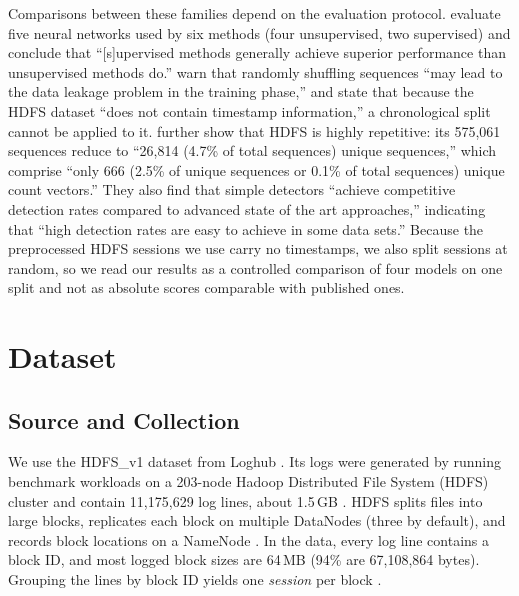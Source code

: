 \documentclass[11pt]{article}
\begin{document}
Comparisons between these families depend on the evaluation protocol.
\citet{chen2022experiencereportdeeplearningbased} evaluate five neural networks used by six methods (four unsupervised,
two supervised) and conclude that ``[s]upervised methods generally achieve superior
performance than unsupervised methods do.'' \citet{LeZhang2022} warn that
randomly shuffling sequences ``may lead to the data leakage problem in the training
phase,'' and state that because the HDFS dataset ``does not contain timestamp
information,'' a chronological split cannot be applied to it.
\citet{Landauer2024} further show that HDFS is highly repetitive: its
575,061 sequences reduce to ``26,814 (4.7\% of total sequences) unique sequences,'' which
comprise ``only 666 (2.5\% of unique sequences or 0.1\% of total sequences) unique count
vectors.'' They also find that simple detectors ``achieve competitive detection rates
compared to advanced state of the art approaches,'' indicating that ``high detection
rates are easy to achieve in some data sets.'' Because the preprocessed HDFS sessions we
use carry no timestamps, we also split sessions at random, so we read our results as a controlled comparison of four models on one split and
not as absolute scores comparable with published ones.

\section{Dataset}
\label{sec:dataset}

\subsection{Source and Collection}
We use the HDFS\_v1 dataset from Loghub \citep{Loghub,Loghub2}. Its logs were
generated by running benchmark workloads on a 203-node Hadoop Distributed File System
(HDFS) cluster \citep{Loghub,Xu2009} and contain 11,175,629 log lines, about
1.5\,GB \citep{He2016}. HDFS splits files into large blocks, replicates each block on
multiple DataNodes (three by default), and records block locations on a NameNode
\citep{10.1109/MSST.2010.5496972}. In the data, every log line contains a block ID, and most logged
block sizes are 64\,MB (94\% are 67,108,864 bytes). Grouping the lines by block ID
yields one \emph{session} per block \citep{Loghub,He2016}.
\end{document}
